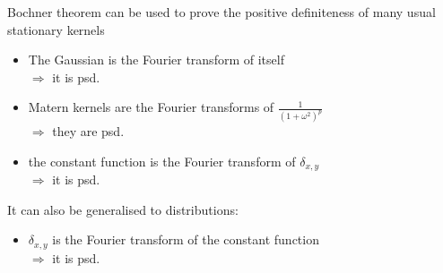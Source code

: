\documentclass{beamer}
\begin{document}
\begin{frame}{}
Bochner theorem can be used to prove the positive definiteness of many usual stationary kernels \vspace{2mm}
\begin{itemize}
  \item The Gaussian is the Fourier transform of itself \\
  \qquad $\Rightarrow$ it is psd.
  \item Matern kernels are the Fourier transforms of $\frac{1}{(1+\omega^2)^p}$ \\
  \qquad $\Rightarrow$ they are psd.
  \item the constant function is the Fourier transform of $\delta_{x,y}$ \\
  \qquad $\Rightarrow$ it is psd.
\end{itemize} \vspace{5mm}
It can also be generalised to distributions: \vspace{2mm}
\begin{itemize}
  \item $\delta_{x,y}$ is the Fourier transform of the constant function \\
  \qquad $\Rightarrow$ it is psd.
\end{itemize}
\end{frame}
\end{document}
